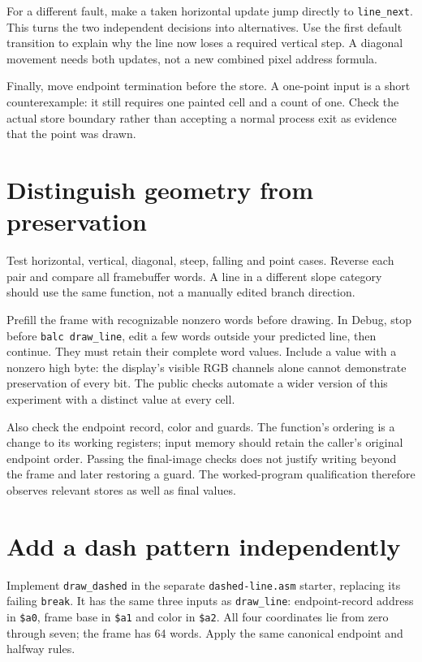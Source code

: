 For a different fault, make a taken horizontal update jump directly to
\texttt{line\_next}. This turns the two independent decisions into alternatives.
Use the first default transition to explain why the line now loses a required
vertical step. A diagonal movement needs both updates, not a new combined pixel
address formula.

Finally, move endpoint termination before the store. A one-point input is a short
counterexample: it still requires one painted cell and a count of one. Check the
actual store boundary rather than accepting a normal process exit as evidence
that the point was drawn.

\section{Distinguish geometry from preservation}

Test horizontal, vertical, diagonal, steep, falling and point cases. Reverse each
pair and compare all framebuffer words. A line in a different slope category
should use the same function, not a manually edited branch direction.

Prefill the frame with recognizable nonzero words before drawing. In Debug, stop
before \texttt{balc draw\_line}, edit a few words outside your predicted line, then
continue. They must retain their complete word values. Include a value with a
nonzero high byte: the display's visible RGB channels alone cannot demonstrate
preservation of every bit. The public checks automate a wider version of this
experiment with a distinct value at every cell.

Also check the endpoint record, color and guards. The function's ordering is a
change to its working registers; input memory should retain the caller's original
endpoint order. Passing the final-image checks does not justify writing beyond
the frame and later restoring a guard. The worked-program qualification therefore
observes relevant stores as well as final values.

\section{Add a dash pattern independently}

Implement \texttt{draw\_dashed} in the separate \texttt{dashed-line.asm} starter,
replacing its failing \texttt{break}. It has the same three inputs as
\texttt{draw\_line}: endpoint-record address in \texttt{\$a0}, frame base in
\texttt{\$a1} and color in \texttt{\$a2}. All four coordinates lie from zero through
seven; the frame has 64 words. Apply the same canonical endpoint and halfway rules.

